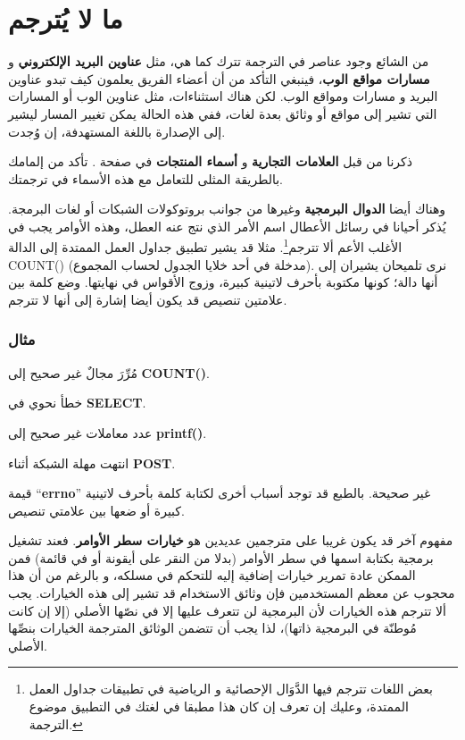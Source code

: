 \section{ما لا يُترجم}
من الشائع وجود عناصر في الترجمة تترك كما هي، مثل {\bf عناوين البريد
الإلكتروني} و {\bf مسارات مواقع الوب}، فينبغي التأكد من أن أعضاء الفريق
يعلمون كيف تبدو عناوين البريد و مسارات ومواقع الوب. لكن هناك استثناءات،
مثل عناوين الوب أو المسارات التي تشير إلى مواقع أو وثائق بعدة لغات، ففي
هذه الحالة يمكن تغيير المسار ليشير إلى الإصدارة باللغة المستهدفة، إن
وُجدت.

ذكرنا من قبل {\bf العلامات التجارية} و {\bf أسماء المنتجات} في صفحة
. تأكد من إلمامك بالطريقة المثلى للتعامل مع
هذه الأسماء في ترجمتك.

وهناك أيضا {\bf الدوال البرمجية} وغيرها من جوانب بروتوكولات الشبكات أو
لغات البرمجة. يُذكر أحيانا في رسائل الأعطال اسم الأمر الذي نتج عنه
العطل، وهذه الأوامر يجب في الأغلب الأعم ألا تترجم\footnote{بعض اللغات
تترجم فيها الدَّوَال الإحصائية و الرياضية في تطبيقات جداول العمل
الممتدة، وعليك إن تعرف إن كان هذا مطبقا في لغتك في التطبيق موضوع
الترجمة.}. مثلا قد يشير تطبيق جداول العمل الممتدة إلى الدالة ‪COUNT()‬
(مدخلة في أحد خلايا الجدول لحساب المجموع). نرى تلميحان يشيران إلى أنها
دالة؛ كونها مكتوبة بأحرف لاتينية كبيرة، وزوج الأقواس في نهايتها. وضع
كلمة بين علامتين تنصيص قد يكون أيضا إشارة إلى أنها لا تترجم.

\subsubsection{مثال}
\startitemize[1]
\item مُرِّرَ مجالٌ غير صحيح إلى {\bf COUNT()}.
\item خطأ نحوي في {\bf SELECT}.
\item عدد معاملات غير صحيح إلى {\bf printf()}.
\item انتهت مهلة الشبكة أثناء {\bf POST}.
\item قيمة “{\bf errno}” غير صحيحة.
\stopitemize
بالطبع قد توجد أسباب أخرى لكتابة كلمة بأحرف لاتينية كبيرة أو ضعها بين
علامتي تنصيص.

مفهوم آخر قد يكون غريبا على مترجمين عديدين هو {\bf خيارات سطر الأوامر}.
فعند تشغيل برمجية بكتابة اسمها في سطر الأوامر (بدلا من النقر على أيقونة
أو في قائمة) فمن الممكن عادة تمرير خيارات إضافية إليه للتحكم في مسلكه،
و بالرغم من أن هذا محجوب عن معظم المستخدمين فإن وثائق الاستخدام قد تشير
إلى هذه الخيارات. يجب ألا تترجم هذه الخيارات لأن البرمجية لن تتعرف
عليها إلا في نصّها الأصلي (إلا إن كانت مُوطنّة في البرمجية ذاتها)، لذا
يجب أن تتضمن الوثائق المترجمة الخيارات بنصِّها الأصلي.

